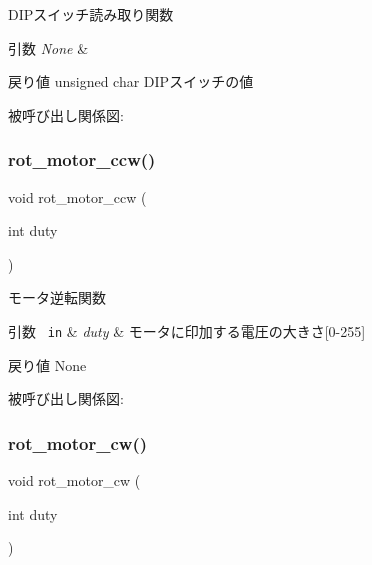 D\+I\+Pスイッチ読み取り関数 


\begin{DoxyParams}{引数}
{\em None} & \\
\hline
\end{DoxyParams}
\begin{DoxyReturn}{戻り値}
unsigned char D\+I\+Pスイッチの値 
\end{DoxyReturn}
被呼び出し関係図\+:
\mbox{\label{iraira__bo__up__down_8ino_a0a80149a1ef7c2030aba634830be590a}} 
\subsubsection{\texorpdfstring{rot\_motor\_ccw()}{rot\_motor\_ccw()}}
{\footnotesize\ttfamily void rot\+\_\+motor\+\_\+ccw (\begin{DoxyParamCaption}\item[{int}]{duty }\end{DoxyParamCaption})}



モータ逆転関数 


\begin{DoxyParams}[1]{引数}
\mbox{\texttt{ in}}  & {\em duty} & モータに印加する電圧の大きさ\mbox{[}0-\/255\mbox{]} \\
\hline
\end{DoxyParams}
\begin{DoxyReturn}{戻り値}
None 
\end{DoxyReturn}
被呼び出し関係図\+:
\mbox{\label{iraira__bo__up__down_8ino_a0c28692fe5e9f44573ec307d7cae2d9b}} 
\subsubsection{\texorpdfstring{rot\_motor\_cw()}{rot\_motor\_cw()}}
{\footnotesize\ttfamily void rot\+\_\+motor\+\_\+cw (\begin{DoxyParamCaption}\item[{int}]{duty }\end{DoxyParamCaption})}



